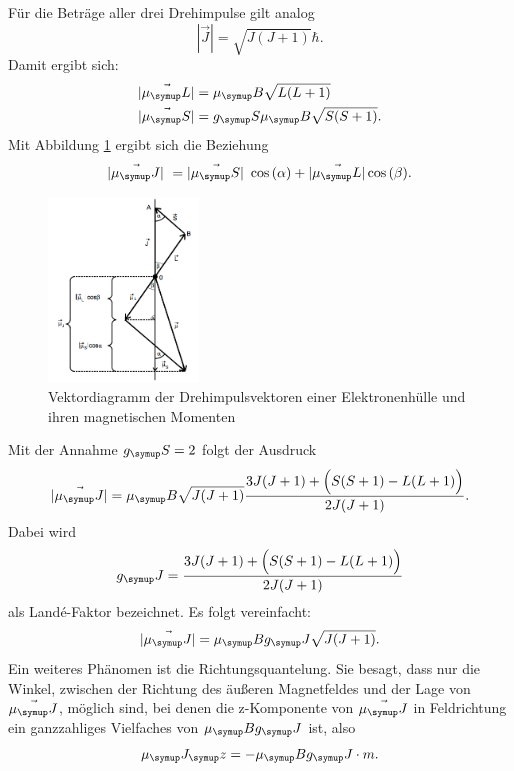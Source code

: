 Für die Beträge aller drei Drehimpulse gilt analog
\begin{equation}
  |\vec{J}| = \sqrt{J(J+1)} \hbar.
\end{equation}
Damit ergibt sich:
\begin{align}
  |\vec{\mu_\su{L}}| &= \mu_\su{B}\sqrt{L(L+1)} \\
  |\vec{\mu_\su{S}}| &= g_\su{S}\mu_\su{B}\sqrt{S(S+1)}.
\end{align}
Mit Abbildung \ref{fig:drehimpuls} ergibt sich die Beziehung
\begin{equation}
  |\vec{\mu_\su{J}}| = |\vec{\mu_\su{S}}| \cos{(\alpha)} + |\vec{\mu_\su{L}}|
  \cos{(\beta)}.
\end{equation}
  \begin{figure}
  \centering
  \includegraphics[width=4cm]{bilder/drehimpuls.png}
  \caption{Vektordiagramm der Drehimpulsvektoren einer Elektronenhülle und ihren
  magnetischen Momenten \cite{606}}
  \label{fig:drehimpuls}
\end{figure}
Mit der Annahme $g_\su{S} = 2$ folgt der Ausdruck
\begin{equation}
  |\vec{\mu_\su{J}}| = \mu_\su{B} \sqrt{J(J+1)} \frac{3J(J+1)+\Big(S(S+1)
  -L(L+1)\Big)}{2J(J+1)}.
\end{equation}
Dabei wird
\begin{equation}
  g_\su{J} = \frac{3J(J+1)+\Big(S(S+1) -L(L+1)\Big)}{2J(J+1)}
\end{equation}
als Landé-Faktor bezeichnet.
Es folgt vereinfacht:
\begin{equation}
  |\vec{\mu_\su{J}}| = \mu_\su{B} g_\su{J} \sqrt{J(J+1)}.
\end{equation}
Ein weiteres Phänomen ist die Richtungsquantelung. Sie besagt, dass nur die Winkel,
zwischen der Richtung des äußeren Magnetfeldes und der Lage von $\vec{\mu_\su{J}}$,
möglich sind, bei denen die z-Komponente von $\vec{\mu_\su{J}}$ in Feldrichtung
ein ganzzahliges Vielfaches von $\mu_\su{B}g_\su{J}$ ist, also
\begin{equation}
  \mu_\su{J_\su{z}} = -\mu_\su{B}g_\su{J}\cdot m. \label{eqn:ori}
\end{equation}
